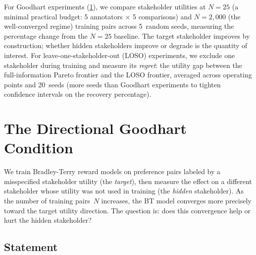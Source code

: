 \documentclass[11pt,letterpaper]{article}
\begin{document}
For Goodhart experiments (\cref{sec:direction}), we compare
stakeholder utilities at $N = 25$ (a minimal practical budget: 5
annotators $\times$ 5 comparisons) and $N = 2{,}000$ (the
well-converged regime) training pairs across 5~random seeds,
measuring the percentage change from the $N = 25$ baseline. The
target stakeholder improves by construction; whether hidden
stakeholders improve or degrade is the quantity of interest. For
leave-one-stakeholder-out (LOSO) experiments, we exclude one
stakeholder during training and measure its \emph{regret}: the
utility gap between the full-information Pareto frontier and the
LOSO frontier, averaged across operating points and 20~seeds (more
seeds than Goodhart experiments to tighten confidence intervals on
the recovery percentage).

\section{The Directional Goodhart Condition}
\label{sec:direction}

We train Bradley-Terry reward models on preference pairs labeled by a
misspecified stakeholder utility (the \emph{target}), then measure the
effect on a different stakeholder whose utility was not used in training
(the \emph{hidden} stakeholder). As the number of training pairs~$N$
increases, the BT model converges more precisely toward the target
utility direction. The question is: does this convergence help or hurt
the hidden stakeholder?

\subsection{Statement}
\end{document}
